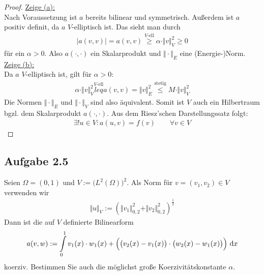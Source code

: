 \begin{proof}
	\underline{Zeige (a):}\\
	Nach Voraussetzung ist $a$ bereits bilinear und symmetrisch. 
	Außerdem ist $a$ positiv definit, da $a$ $V$-elliptisch ist. 
	Das sieht man durch
	\begin{align*}
		|a(v,v)|=a(v,v)\stackrel{V\text{-ell}}{\geq}
		\alpha\cdot\Vert v\Vert^2_V\geq0
	\end{align*}
	für ein $\alpha>0$. 
	Also $a(\cdot,\cdot)$ ein Skalarprodukt und $\Vert\cdot\Vert_E$ eine (Energie-)Norm.\nl
	\underline{Zeige (b):}\\
	Da $a$ $V$-elliptisch ist, gilt für $\alpha>0$:
	\begin{align*}
		\alpha\cdot\Vert v\Vert_V^2
		\overset{V\text{-ell}}{leq}
		a(v,v)=\Vert v\Vert_E^2
		\overset{\text{stetig}}{\leq}
		M\cdot\Vert v\Vert_V^2
	\end{align*}
	Die Normen $\Vert\cdot\Vert_E$ und $\Vert\cdot\Vert_V$ sind also äquivalent. 
	Somit ist $V$ auch ein Hilbertraum bgzl. dem Skalarprodukt $a(\cdot,\cdot)$.\nl
	Aus dem Riesz'schen Darstellungssatz folgt:
	\begin{align*}
		\exists! u\in V:a(u,v)=f(v)\qquad\forall v\in V
	\end{align*}
\end{proof}

\subsection{Aufgabe 2.5}
Seien $\Omega=(0,1)$ und $V:=\big(L^2(\Omega)\big)^2$. 
Als Norm für $v=(v_1,v_2)\in V$ verwenden wir
\begin{align*}
	\Vert u\Vert_V:=\left(\Vert v_1\Vert_{0,2}^2+\Vert v_2\Vert^2_{0,2}\right)^{\frac{1}{2}}
\end{align*}
Dann ist die auf $V$ definierte Bilinearform
\begin{align*}
	a(v,w):=\int\limits_0^1 v_1(x)\cdot w_1(x)+\Big(\big(v_2(x)-v_1(x)\big)\cdot\big(w_2(x)-w_1(x)\big)\Big)\text{ d} x
\end{align*}
koerziv. 
Bestimmen Sie auch die möglichst große Koerzivitätskonstante $\alpha$.

